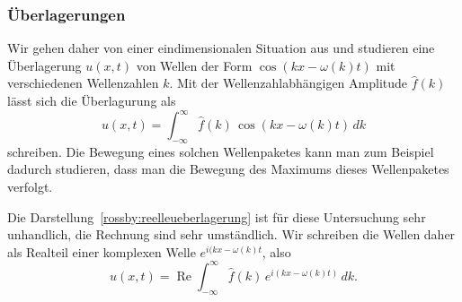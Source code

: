 \subsubsection{Überlagerungen}
Wir gehen daher von einer eindimensionalen Situation aus und studieren
eine Überlagerung $u(x,t)$ von Wellen der Form $\cos(kx-\omega(k) t)$
mit verschiedenen Wellenzahlen $k$.
Mit der Wellenzahlabhängigen Amplitude $\hat f(k)$ lässt sich die
Überlagurung als
\begin{equation}
u(x,t)
=
\int_{-\infty}^\infty \hat f(k)\,\cos(kx-\omega(k)t)\,dk
\label{rossby:reelleueberlagerung}
\end{equation}
schreiben.
Die Bewegung eines solchen Wellenpaketes kann man zum Beispiel
dadurch studieren, dass man die Bewegung des Maximums dieses 
Wellenpaketes verfolgt.

Die Darstellung~\eqref{rossby:reelleueberlagerung} ist für diese
Untersuchung sehr unhandlich, die Rechnung sind sehr umständlich.
Wir schreiben die Wellen daher als Realteil einer komplexen
Welle $e^{i(kx-\omega(k)t}$, also
\begin{equation}
u(x,t)
=
\operatorname{Re}
\int_{-\infty}^\infty \hat f(k)\,e^{i(kx-\omega(k)t)}\,dk.
\label{rossby:komplexeueberlagerung}
\end{equation}

